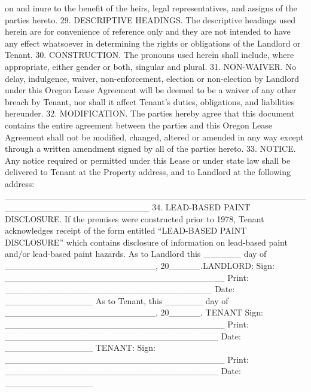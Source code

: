 on and inure to the benefit of the heirs, legal representatives, and assigns of the parties hereto.
29. DESCRIPTIVE HEADINGS. The descriptive headings used herein are for convenience of
reference only and they are not intended to have any effect whatsoever in determining the rights
or obligations of the Landlord or Tenant.
30. CONSTRUCTION. The pronouns used herein shall include, where appropriate, either gender or
both, singular and plural.
31. NON-WAIVER. No delay, indulgence, waiver, non-enforcement, election or non-election by
Landlord under this Oregon Lease Agreement will be deemed to be a waiver of any other breach
by Tenant, nor shall it affect Tenant's duties, obligations, and liabilities hereunder.
32. MODIFICATION. The parties hereby agree that this document contains the entire agreement
between the parties and this Oregon Lease Agreement shall not be modified, changed, altered or
amended in any way except through a written amendment signed by all of the parties hereto.
33. NOTICE. Any notice required or permitted under this Lease or under state law shall be delivered
to Tenant at the Property address, and to Landlord at the following address:
_______________________________________________________________________
34.
LEAD-BASED PAINT DISCLOSURE.
If the premises were constructed prior to 1978, Tenant
acknowledges receipt of the form entitled “LEAD-BASED PAINT DISCLOSURE” which contains
disclosure of information on lead-based paint and/or lead-based paint hazards.
As to Landlord this ______ day of ________________________, 20_____.LANDLORD:
Sign: ___________________________________
Print: _________________________________ Date: ______________
As to Tenant, this ______ day of ________________________, 20_____.
TENANT
Sign: ___________________________________
Print: __________________________________ Date: ______________
TENANT:
Sign: ___________________________________
Print: __________________________________ Date: ______________
